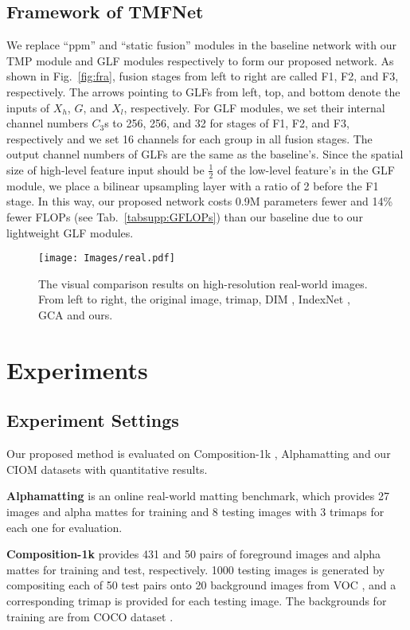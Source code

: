 \documentclass[10pt,twocolumn,letterpaper]{article}
\begin{document}
\subsection{Framework of TMFNet}
We replace ``ppm'' and ``static fusion'' modules in the baseline network with our TMP module and GLF modules respectively to form our proposed network. As shown in Fig.~\ref{fig:fra}, fusion stages from left to right are called F1, F2, and F3, respectively. The arrows pointing to GLFs from left, top, and bottom denote the inputs of $X_h$, $G$, and $X_l$, respectively. For GLF modules, we set their internal channel numbers $C_3$s 
to 256, 256, and 32 for stages of F1, F2, and F3, respectively and we set 16 channels for each group in all fusion stages. The output channel numbers of GLFs are the same as the baseline's. Since the spatial size of high-level feature input should be $\frac{1}{2}$ of the low-level feature's in the GLF module, we place a bilinear upsampling layer with a ratio of 2 before the F1 stage. In this way, our proposed network costs 0.9M parameters fewer and 14\% fewer FLOPs (see Tab.~\ref{tabsupp:GFLOPs}) than our baseline due to our lightweight GLF modules.


\begin{figure*}[h]
	\centering
	\texttt{[image: Images/real.pdf]}
	\caption{The visual comparison results on high-resolution real-world images. From left to right, the original image, trimap, DIM \cite{deepmatting}, IndexNet \cite{indexnet}, GCA \cite{gca} and ours. }
	\label{fig:real}
\end{figure*}

\section{Experiments}
\subsection{Experiment Settings}

Our proposed method is evaluated on Composition-1k \cite{deepmatting}, Alphamatting \cite{alphamatting} and our CIOM datasets with  quantitative results.

\textbf{Alphamatting} \cite{alphamatting} is an online real-world matting benchmark,
which provides 27 images and alpha mattes for training and 8 testing images with 3 trimaps for each one for evaluation.

\textbf{Composition-1k} \cite{deepmatting} provides 431 and 50 pairs of foreground images and alpha mattes for training and test, respectively. 1000 testing images is generated by compositing each of 50 test pairs onto 20 background images from VOC \cite{voc}, and a corresponding trimap is provided for each testing image. The backgrounds for training are from COCO dataset \cite{coco}.
\end{document}
